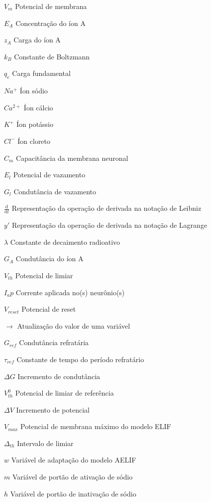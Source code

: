 \documentclass[
	12pt,				%
	openright,			%
	oneside,			%
	a4paper,			%
	chapter=TITLE,		%
	english,			%
	french,				%
	spanish,			%
	brazil				%
	]{abntex2}
\theoremstyle{definition}
\begin{document}
\begin{simbolos}
\item[$V_m$] Potencial de membrana
\item[$E_A$] Concentração do íon A
\item[$z_A$] Carga do íon A
\item[$k_B$] Constante de Boltzmann
\item[$q_e$] Carga fundamental
\item[$Na^+$] Íon sódio
\item[$Ca^{2+}$] Íon cálcio
\item[$K^+$] Íon potássio
\item[$Cl^-$] Íon cloreto
\item[$C_m$] Capacitância da membrana neuronal
\item[$E_l$] Potencial de vazamento
\item[$G_l$] Condutância de vazamento
\item[$\frac{\mathrm{d}}{\mathrm{d}t}$] Representação da operação de derivada na notação de Leibniz
\item[$y'$] Representação da operação de derivada na notação de Lagrange
\item[$\lambda$] Constante de decaimento radioativo
\item[$G_A$] Condutância do íon A
\item[$V_{th}$] Potencial de limiar
\item[$I_ap$] Corrente aplicada no(s) neurônio(s)
\item[$V_{reset}$] Potencial de reset
\item[$\to$] Atualização do valor de uma variável
\item[$G_{ref}$] Condutância refratária
\item[$\tau_{ref}$] Constante de tempo do período refratário
\item[$\Delta G$] Incremento de condutância
\item[$V_{th}^0$] Potencial de limiar de referência
\item[$\Delta V$] Incremento de potencial
\item[$V_{max}$] Potencial de membrana máximo do modelo ELIF
\item[$\Delta_{th}$] Intervalo de limiar
\item[$w$] Variável de adaptação do modelo AELIF
\item[$m$] Variável de portão de ativação de sódio
\item[$h$] Variável de portão de inativação de sódio

\end{simbolos}
\end{document}
